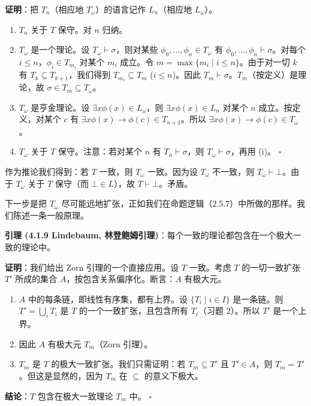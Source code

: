 \documentclass[12pt, a4paper]{article}
\begin{document}
\textbf{证明}：把 \(T_n\)（相应地 \(T_\omega\)）的语言记作 \(L_n\)（相应地 \(L_\omega\)）。
\begin{enumerate}
    \item[(i)] \(T_n\) 关于 \(T\) 保守。对 \(n\) 归纳。
    \item[(ii)] \(T_\omega\) 是一个理论。设 \(T_\omega \vdash \sigma\)，则对某些 \(\phi_0, \dots, \phi_n \in T_\omega\) 有 \(\phi_0, \dots, \phi_n \vdash \sigma\)。对每个 \(i \leq n\)，\(\phi_i \in T_{m_i}\) 对某个 \(m_i\) 成立。令 \(m = \max\{m_i \mid i \leq n\}\)。由于对一切 \(k\) 有 \(T_k \subseteq T_{k+1}\)，我们得到 \(T_{m_i} \subseteq T_m\) (\(i \leq n\))。因此 \(T_m \vdash \sigma\)。\(T_m\)（按定义）是理论，故 \(\sigma \in T_m \subseteq T_\omega\)。
    \item[(iii)] \(T_\omega\) 是亨金理论。设 \(\exists x \phi(x) \in L_\omega\)，则 \(\exists x \phi(x) \in L_n\) 对某个 \(n\) 成立。按定义，对某个 \(c\) 有 \(\exists x \phi(x) \to \phi(c) \in T_{n+1}\)。所以 \(\exists x \phi(x) \to \phi(c) \in T_\omega\)。
    \item[(iv)] \(T_\omega\) 关于 \(T\) 保守。注意：若对某个 \(n\) 有 \(T_n \vdash \sigma\)，则 \(T_\omega \vdash \sigma\)，再用 (i)。 \hfill \(\square\)
\end{enumerate}

作为推论我们得到：若 \(T\) 一致，则 \(T_\omega\) 一致。因为设 \(T_\omega\) 不一致，则 \(T_\omega \vdash \bot\)。由于 \(T_\omega\) 关于 \(T\) 保守（而 \(\bot \in L\)），故 \(T \vdash \bot\)。矛盾。

下一步是把 \(T_\omega\) 尽可能远地扩张，正如我们在命题逻辑（2.5.7）中所做的那样。我们陈述一条一般原理。

\begin{mdframed}
\textbf{引理 (4.1.9 Lindebaum, 林登鲍姆引理)}：每个一致的理论都包含在一个极大一致的理论中。
\end{mdframed}

\textbf{证明}：我们给出 Zorn 引理的一个直接应用。设 \(T\) 一致。考虑 \(T\) 的一切一致扩张 \(T'\) 所成的集合 \(A\)，按包含关系偏序化。断言：\(A\) 有极大元。
\begin{enumerate}
    \item \(A\) 中的每条链，即线性有序集，都有上界。设 \(\{T_i \mid i \in I\}\) 是一条链。则 \(T' = \bigcup_i T_i\) 是 \(T\) 的一个一致扩张，且包含所有 \(T_i\)（习题 2）。所以 \(T'\) 是一个上界。
    \item 因此 \(A\) 有极大元 \(T_m\)（Zorn 引理）。
    \item \(T_m\) 是 \(T\) 的极大一致扩张。我们只需证明：若 \(T_m \subseteq T'\) 且 \(T' \in A\)，则 \(T_m = T'\)。但这是显然的，因为 \(T_m\) 在 \(\subseteq\) 的意义下极大。
\end{enumerate}
\textbf{结论}：\(T\) 包含在极大一致理论 \(T_m\) 中。 \hfill \(\square\)
\end{document}
